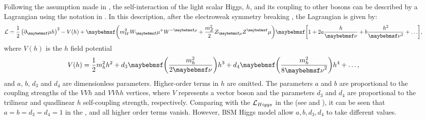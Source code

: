 Following the assumption made in  \cite{Contino:2010mh,Contino:2013gna}, the self-interaction of the light scalar Higgs, $h$, and its coupling to other \SM bosons can be described by a Lagrangian using the notation in  \cite{Contino:2013gna}. In this description, after the electroweak symmetry breaking , the  Lagrangian is given by:
\begin{equation}
\Lagr =\frac{1}{2}\left(\partial_\mu{h}\right)^2  - V(h) + \parenths{m_W^2{W}_\mu^+{W}^{-\mu} + \frac{m_Z^2}{2}Z_{\mu}Z^\mu}\sqbracs{1 + 2a\frac{h}{\nu} + b \frac{h^2}{\nu^2} + \hdots},
\end{equation}
where $V(h)$ is the $h$ field potential
\begin{equation}
V(h) = \frac{1}{2}m_h^2h^2 + d_3\parenths{\frac{m_h^2}{2\nu}}h^3 + d_4\parenths{\frac{m_h^2}{8{\nu}^2}}h^4 + \hdots ,
\end{equation}
and $a$, $b$, $d_3$ and $d_4$ are  dimensionless parameters. Higher-order terms in $h$ are omitted. The parameters $a$ and $b$ are proportional to the coupling strengths of the $VVh$ and $VVhh$ vertices, where $V$ represents a vector boson and the parameters $d_3$ and $d_4$ are proportional to the trilinear and quadlinear $h$ self-coupling strength, respectively. Comparing with the  $\operatorname{\mathcal{L}}_{Higgs} $ in the \SM (see  and ),  it can be seen that $a=b=d_3=d_4=1$ in the \SM, and all higher order terms vanish. However, BSM Higgs model allow $a,b,d_3,d_4$ to take different values.

